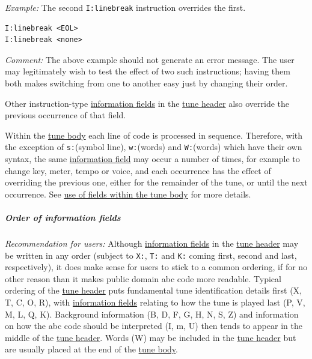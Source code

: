 \documentclass[oneside]{book}
\let\oldsubparagraph\subparagraph
\renewcommand{\subparagraph}[1]{\oldsubparagraph{#1}\mbox{}}
\begin{document}
\emph{Example:} The second \texttt{I:linebreak} instruction overrides
the first.

\begin{verbatim}
I:linebreak <EOL>
I:linebreak <none>
\end{verbatim}

\emph{Comment:} The above example should not generate an error message.
The user may legitimately wish to test the effect of two such
instructions; having them both makes switching from one to another easy
just by changing their order.

Other instruction-type
\protect\hyperlink{information_field_definition}{information fields} in
the \protect\hyperlink{tune_header_definition}{tune header} also
override the previous occurrence of that field.

Within the \protect\hyperlink{tune_body_definition}{tune body} each line
of code is processed in sequence. Therefore, with the exception of
\texttt{s:}(symbol line), \texttt{w:}(words) and \texttt{W:}(words)
which have their own syntax, the same
\protect\hyperlink{information_field_definition}{information field} may
occur a number of times, for example to change key, meter, tempo or
voice, and each occurrence has the effect of overriding the previous
one, either for the remainder of the tune, or until the next occurrence.
See \protect\hyperlink{use_of_fields_within_the_tune_body}{use of fields
within the tune body} for more details.

\subparagraph{Order of information
fields}\label{order_of_information_fields}

\emph{Recommendation for users:} Although
\protect\hyperlink{information_field_definition}{information fields} in
the \protect\hyperlink{tune_header_definition}{tune header} may be
written in any order (subject to \texttt{X:}, \texttt{T:} and
\texttt{K:} coming first, second and last, respectively), it does make
sense for users to stick to a common ordering, if for no other reason
than it makes public domain abc code more readable. Typical ordering of
the \protect\hyperlink{tune_header_definition}{tune header} puts
fundamental tune identification details first (X, T, C, O, R), with
\protect\hyperlink{information_field_definition}{information fields}
relating to how the tune is played last (P, V, M, L, Q, K). Background
information (B, D, F, G, H, N, S, Z) and information on how the abc code
should be interpreted (I, m, U) then tends to appear in the middle of
the \protect\hyperlink{tune_header_definition}{tune header}. Words (W)
may be included in the \protect\hyperlink{tune_header_definition}{tune
header} but are usually placed at the end of the
\protect\hyperlink{tune_body}{tune body}.
\end{document}
